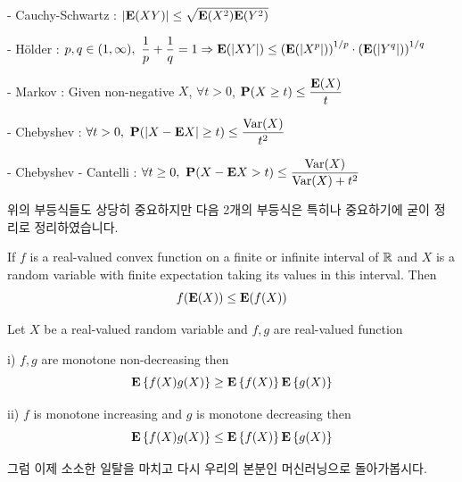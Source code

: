 \documentclass[final]{IEEEphot}
\begin{document}
\VS

- Cauchy-Schwartz : $\displaystyle |\mathbf{E}(XY)| \leq \sqrt{\mathbf{E}(X^2)\mathbf{E}(Y^2)}$

\vs

- H{\"o}lder : $\displaystyle p,q \in (1,\infty),~\frac{1}{p} + \frac{1}{q} = 1 \Rightarrow \mathbf{E}(|XY|) \leq \left( \mathbf{E}(|X^p|) \right)^{1/p} \cdot \left( \mathbf{E} (|Y^q|) \right)^{1/q}$

\vs

- Markov : Given non-negative $X$, $\forall t > 0$, $\displaystyle \mathbf{P}(X\geq t) \leq \frac{\mathbf{E}(X)}{t}$

\vs

- Chebyshev : $\displaystyle \forall t > 0, ~\mathbf{P}(|X - \mathbf{E} X| \geq t) \leq \frac{\operatorname*{Var}(X)}{t^2}$

\vs

- Chebyshev - Cantelli : $\displaystyle \forall t \geq 0,~ \mathbf{P}(X-\mathbf{E} X > t ) \leq \frac{\operatorname*{Var}(X)}{\operatorname*{Var}(X) + t^2}$

\VS

위의 부등식들도 상당히 중요하지만 다음 2개의 부등식은 특히나 중요하기에 굳이 정리로 정리하였습니다.

\begin{theorem}
	If $f$ is a real-valued convex function on a finite or infinite interval of $\mathbb{R}$ and $X$ is a random variable with finite expectation taking its values in this interval. Then
	$$f(\mathbf{E}(X)) \leq \mathbf{E}(f(X))$$
	
	\HL
\end{theorem}

\begin{theorem}
	Let $X$ be a real-valued random variable and $f,g$ are real-valued function
	
	i) $f,g$ are monotone non-decreasing then
	$$ \mathbf{E}\left\{ f(X) g(X) \right\} \geq \mathbf{E}\left\{ f(X) \right\}\mathbf{E}\left\{ g(X) \right\}$$
	
	ii) $f$ is monotone increasing and $g$ is monotone decreasing then
	$$ \mathbf{E}\left\{ f(X) g(X) \right\} \leq \mathbf{E}\left\{ f(X) \right\}\mathbf{E}\left\{ g(X) \right\}$$
	
	\HL
\end{theorem}

그럼 이제 소소한 일탈을 마치고 다시 우리의 본분인 머신러닝으로 돌아가봅시다.

%
%


\end{document}
